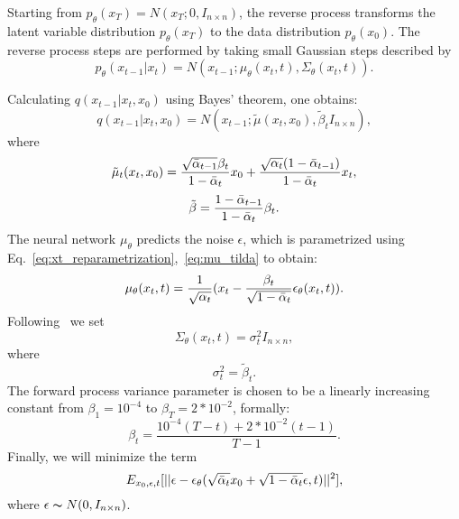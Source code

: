 \documentclass[10pt,twocolumn,letterpaper]{article}
\begin{document}
Starting from $p_\theta(x_T)=N(x_T;0,I_{n\times n})$, the reverse process transforms the latent variable distribution $p_\theta(x_T)$ to the data distribution $p_\theta(x_0)$. The reverse process steps are performed by taking small Gaussian steps described by 
\begin{equation}
    p_\theta(x_{t-1}|x_t) 
    = 
    N(x_{t-1};\mu_\theta(x_t,t), \Sigma_\theta(x_t,t)).
\label{eq:reverse_process}
\end{equation}

Calculating $q(x_{t-1}|x_t,x_0)$ using Bayes' theorem, one obtains:
\begin{equation}
    q(x_{t-1}|x_t,x_0) 
    = 
    N(x_{t-1}; \tilde{\mu}(x_t, x_0), \tilde{\beta}_t I_{n\times n}),
\end{equation}
where 
\begin{equation}
    \tilde{\mu}_t(x_t, x_0) 
    = 
    \frac{\sqrt{\Bar{\alpha}_{t-1}}\beta_t}{1-\Bar{\alpha}_t}x_0 + \frac{\sqrt{\alpha_t}(1-\Bar{\alpha}_{t-1})}{1-\Bar{\alpha}_t}x_t,
\label{eq:mu_tilda}
\end{equation}
\begin{equation}
    \tilde{\beta} 
    = 
    \frac{1-\Bar{\alpha}_{t-1}}{1-\Bar{\alpha}_t}\beta_t.
\end{equation}
The neural network $\mu_\theta$ predicts the noise $\epsilon$, which is parametrized using Eq.~\ref{eq:xt_reparametrization},~\ref{eq:mu_tilda} to obtain:
\begin{equation}
    \mu_\theta(x_t,t)
    =
    \frac{1}{\sqrt{\alpha_t}}(x_t - \frac{\beta_t}{\sqrt{1-\Bar{\alpha}_t}}\epsilon_\theta(x_t,t)).
\label{eq:mu_theta}
\end{equation}
Following~\cite{ho2020denoising} we set 
\begin{equation}
    \Sigma_\theta(x_t,t)
    =
    \sigma^2_t I_{n\times n},
\end{equation}
where  
\begin{equation}
    \sigma^2_t
    =
    \tilde{\beta}_t.
\end{equation}
The forward process variance parameter is chosen to be a linearly increasing constant from $\beta_1 = 10^{-4}$ to $\beta_T = 2*10^{-2}$, formally:
\begin{equation}
    \beta_t
    =
    \frac{10^{-4}(T-t) + 2*10^{-2}(t-1)}{T-1}.
\label{eq:beta_t}
\end{equation}
Finally, we will minimize the term 
\begin{equation}
    E_{x_0,\epsilon,t}[||\epsilon-\epsilon_\theta(\sqrt{\Bar{\alpha}_t}x_0 + \sqrt{1-\Bar{\alpha}_t}\epsilon, t)||^2],
\label{eq:expectation_loss_term}
\end{equation}
where $\epsilon \thicksim N(0,I_{n\times n})$.
\end{document}
